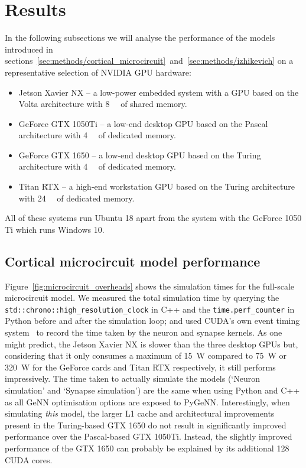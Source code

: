 \documentclass[utf8]{frontiersSCNS} %
\begin{document}
\section{Results}
In the following subsections we will analyse the performance of the models introduced in sections~\ref{sec:methods/cortical_microcircuit}~and~\ref{sec:methods/izhikevich} on a representative selection of NVIDIA GPU hardware:
%
\begin{itemize}
    \item Jetson Xavier NX -- a low-power embedded system with a GPU based on the Volta architecture with \SI{8}{\giga\byte} of shared memory.
    \item GeForce GTX 1050Ti -- a low-end desktop GPU based on the Pascal architecture with \SI{4}{\giga\byte} of dedicated memory.
    \item GeForce GTX 1650 -- a low-end desktop GPU based on the Turing architecture with \SI{4}{\giga\byte} of dedicated memory.
    \item Titan RTX -- a high-end workstation GPU based on the Turing architecture with \SI{24}{\giga\byte} of dedicated memory.
\end{itemize}
%
All of these systems run Ubuntu 18 apart from the system with the GeForce 1050 Ti which runs Windows 10.

\subsection{Cortical microcircuit model performance}
Figure~\ref{fig:microcircuit_overheads} shows the simulation times for the full-scale microcircuit model.
We measured the total simulation time by querying the \lstinline{std::chrono::high_resolution_clock} in C++ and the \lstinline{time.perf_counter} in Python before and after the simulation loop; and used CUDA's own event timing system~\citep[Section~3.2.6.7]{NVIDIACorporation2018} to record the time taken by the neuron and synapse kernels.
As one might predict, the Jetson Xavier NX is slower than the three desktop GPUs but, considering that it only consumes a maximum of \SI{15}{\watt} compared to \SI{75}{\watt} or \SI{320}{\watt} for the GeForce cards and Titan RTX respectively, it still performs impressively.
The time taken to actually simulate the models (`Neuron simulation' and `Synapse simulation') are the same when using Python and C++ as all GeNN optimisation options are exposed to PyGeNN.
Interestingly, when simulating \emph{this} model, the larger L1 cache and architectural improvements present in the Turing-based GTX 1650 do not result in significantly improved performance over the Pascal-based GTX 1050Ti.
Instead, the slightly improved performance of the GTX 1650 can probably be explained by its additional \num{128} CUDA cores.
\end{document}
